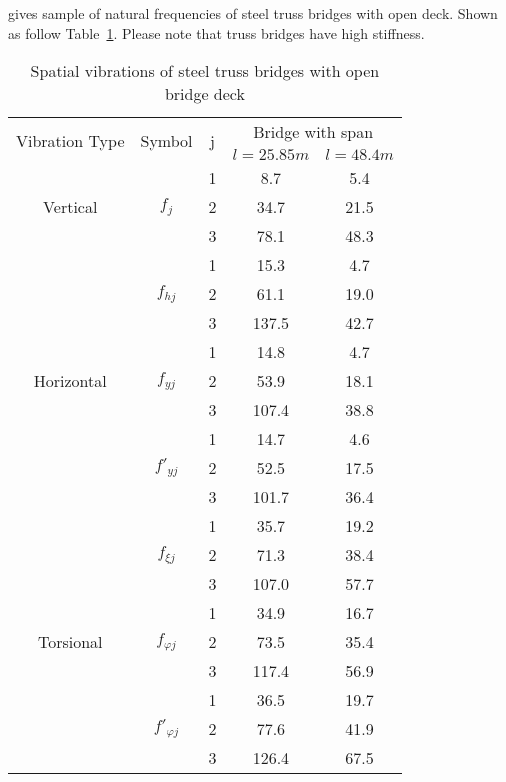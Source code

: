 \cite[Table 9.1]{fryba1996dynamics} gives sample of natural frequencies of steel truss bridges with open deck. Shown as follow Table~\ref{tab:spatialvibrationsteel}. Please note that truss bridges have high stiffness.

\begin{table}[h]
	\centering
	\begin{tabular}{ccccc}
		\hline
		\multirow{2}{*}{Vibration Type} & \multirow{2}{*}{Symbol} & \multirow{2}{*}{j} & \multicolumn{2}{c}{Bridge with span} \\
		\cline{4-5}
		 & & & $ l=25.85m $ & $ l=48.4m $\\
		\hline
		\multirow{3}{*}{Vertical} & \multirow{3}{*}{$ f_j $} & 1 & 8.7 & 5.4\\
		 & & 2 & 34.7 & 21.5 \\
	 	 & & 3 & 78.1 & 48.3 \\
	 	\hline
	 	\multirow{9}{*}{Horizontal} & \multirow{3}{*}{$ f_{hj} $} & 1 & 15.3 & 4.7 \\
	 	 & & 2 & 61.1 & 19.0 \\
	 	 & & 3 & 137.5 & 42.7 \\
	 	\cline{2-5}
	 	 & \multirow{3}{*}{$ f_{yj} $} & 1 & 14.8 & 4.7 \\
	 	 & & 2 & 53.9 & 18.1 \\
	 	 & & 3 & 107.4 & 38.8 \\ 
	 	\cline{2-5}
	 	 & \multirow{3}{*}{$ {f}'_{yj} $} & 1 & 14.7 & 4.6 \\
	 	 & & 2 & 52.5 & 17.5 \\
	 	 & & 3 & 101.7 & 36.4 \\ 
	 	\cline{2-5}
	 	\hline
	 	\multirow{9}{*}{Torsional} & \multirow{3}{*}{$ f_{\xi j} $} & 1 & 35.7 & 19.2 \\
	 	 & & 2 & 71.3 & 38.4 \\
	 	 & & 3 & 107.0 & 57.7 \\
	 	\cline{2-5}
	 	 & \multirow{3}{*}{$ f_{\varphi j} $} & 1 & 34.9 & 16.7 \\
	 	 & & 2 & 73.5 & 35.4 \\
	 	 & & 3 & 117.4 & 56.9 \\ 
	 	\cline{2-5}
	 	 & \multirow{3}{*}{$ {f}'_{\varphi j} $} & 1 & 36.5 & 19.7 \\
	 	 & & 2 & 77.6 & 41.9 \\
	 	 & & 3 & 126.4 & 67.5 \\ 
	 	\hline
	\end{tabular}
	\caption{Spatial vibrations of steel truss bridges with open bridge deck}
	\label{tab:spatialvibrationsteel}
\end{table}


